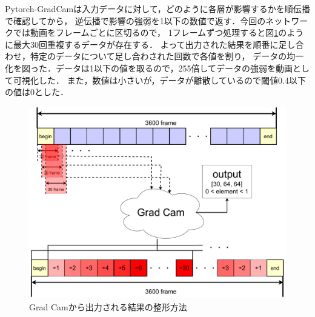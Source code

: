 Pytorch-GradCamは入力データに対して，どのように各層が影響するかを順伝播で確認してから，
逆伝播で影響の強弱を1以下の数値で返す．今回のネットワークでは動画をフレームごとに区切るので，
1フレームずつ処理すると図\ref{camgraph}のように最大30回重複するデータが存在する．
よって出力された結果を順番に足し合わせ，特定のデータについて足し合わされた回数で各値を割り，
データの均一化を図った．データは1以下の値を取るので，255倍してデータの強弱を動画として可視化した．
また，数値は小さいが，データが離散しているので閾値0.4以下の値は0とした．

\begin{figure}[b]
  \begin{center}
    \includegraphics[width=120mm]{images/chart/gradcam.pdf}
  \end{center}
  \caption{Grad Camから出力される結果の整形方法}
  \label{camgraph}
\end{figure}
\clearpage

